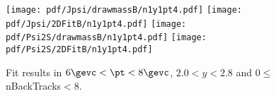 \begin{figure}[H]
\begin{center}
\texttt{[image: pdf/Jpsi/drawmassB/n1y1pt4.pdf]}
\texttt{[image: pdf/Jpsi/2DFitB/n1y1pt4.pdf]}
\vspace*{-0.5cm}
\texttt{[image: pdf/Psi2S/drawmassB/n1y1pt4.pdf]}
\texttt{[image: pdf/Psi2S/2DFitB/n1y1pt4.pdf]}
\vspace*{-0.5cm}
\end{center}
\caption{Fit results in $6\gevc<\pt<8\gevc$, $2.0<y<2.8$ and 0$\leq$nBackTracks$<$8.}
\label{Fitn1y1pt4}
\end{figure}
